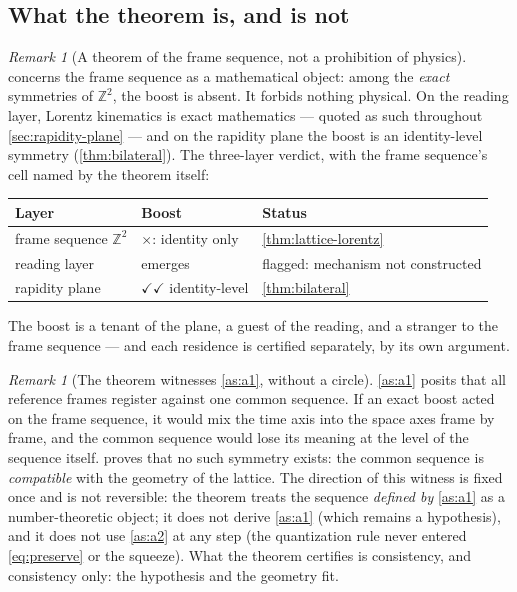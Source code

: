 \documentclass[11pt]{amsbook}
\theoremstyle{plain}
\theoremstyle{definition}
\theoremstyle{remark}
\newtheorem{remark}[theorem]{Remark}
\begin{document}
\subsection{What the theorem is, and is not}\label{sec:witness}

\begin{remark}[A theorem of the frame sequence, not a prohibition of physics]\label{rem:not-prohibition}
 concerns the frame sequence as a mathematical object: among the \emph{exact} symmetries of $\mathbb{Z}^{2}$, the boost is absent. It forbids nothing physical. On the reading layer, Lorentz kinematics is exact mathematics --- quoted as such throughout \cref{sec:rapidity-plane} --- and on the rapidity plane the boost is an identity-level symmetry (\cref{thm:bilateral}). The three-layer verdict, with the frame sequence's cell named by the theorem itself:
\begin{center}
\begin{tabular}{@{}lll@{}}
\toprule
Layer & Boost & Status \\
\midrule
frame sequence $\mathbb{Z}^{2}$ & $\times$: identity only & \cref{thm:lattice-lorentz} \\
reading layer & emerges & flagged: mechanism not constructed \\
rapidity plane & $\checkmark\checkmark$ identity-level & \cref{thm:bilateral} \\
\bottomrule
\end{tabular}
\end{center}
The boost is a tenant of the plane, a guest of the reading, and a stranger to the frame sequence --- and each residence is certified separately, by its own argument.
\end{remark}

\begin{remark}[The theorem witnesses \cref{as:a1}, without a circle]\label{rem:witness}
\cref{as:a1} posits that all reference frames register against one common sequence. If an exact boost acted on the frame sequence, it would mix the time axis into the space axes frame by frame, and the common sequence would lose its meaning at the level of the sequence itself.  proves that no such symmetry exists: the common sequence is \emph{compatible} with the geometry of the lattice. The direction of this witness is fixed once and is not reversible: the theorem treats the sequence \emph{defined by} \cref{as:a1} as a number-theoretic object; it does not derive \cref{as:a1} (which remains a hypothesis), and it does not use \cref{as:a2} at any step (the quantization rule never entered \cref{eq:preserve} or the squeeze). What the theorem certifies is consistency, and consistency only: the hypothesis and the geometry fit.
\end{remark}
\end{document}
